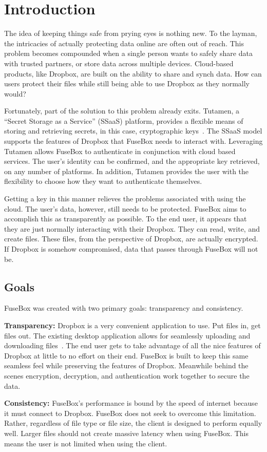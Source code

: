 \documentclass[11pt,twocolumn,letterpaper]{article}
\newcommand{\appname}{FuseBox }
\newcommand{\appnameWOspace}{FuseBox}
\newcommand{\custos}{Tutamen }
\newcommand{\custosWOspace}{Tutamen}
\begin{document}
\section{Introduction}
\label{sec:intro}
The idea of keeping things safe from prying eyes is nothing new.
To the layman, the intricacies of
actually protecting data online are often out of reach. This problem
becomes compounded when a single person wants to safely share data
with trusted partners, or store data across multiple devices.
Cloud-based products, like Dropbox, are built
on the ability to share and synch data. How can users protect their
files while still being able to use Dropbox as they normally would? 
\par Fortunately, part of the solution to this problem already exits.
\custosWOspace, a ``Secret Storage as a Service'' (SSaaS) platform, 
provides a flexible means of storing and
retrieving secrets, in this case, cryptographic
keys~\cite{custostrios}. 
The SSaaS model supports the features of
Dropbox that \appname needs to interact with. Leveraging \custos allows \appname to 
authenticate in conjunction with cloud based services. The user's
identity can be confirmed, and the appropriate key retrieved, on any number
of platforms. In addition, \custos provides the user with the 
flexibility to choose how they want to authenticate themselves. 
\par Getting a key in this manner relieves the problems associated
with using the cloud. The user's data, however, still needs to be
protected. \appname aims to accomplish this as transparently as
possible. To the end user, it appears that they are just normally
interacting with their Dropbox. They can read, write, and create
files. These files, from the perspective of Dropbox, are actually
encrypted. If Dropbox is somehow compromised, data that passes through \appname
will not be.    

\subsection{Goals}
\label{sec:goals}
\appname was created with two primary goals: transparency and consistency. 
\par {\bf Transparency:} Dropbox is a very convenient application to
use. Put files in, get files out. The existing desktop application
allows for seamlessly uploading and downloading files~\cite{dropboxclient}. The end user
gets to take advantage of all the nice features of Dropbox at little
to no effort on their end. \appname is built to keep this same 
seamless feel while preserving the features of Dropbox. Meanwhile behind the
scenes encryption, decryption, and authentication work together to
secure the data.     
\par {\bf Consistency:} \appnameWOspace's performance is bound by
the speed of internet because it must connect to Dropbox. 
\appname does not seek to overcome this
limitation. Rather, regardless of file type or file size, the client
is designed to perform equally well. Larger files should not create
massive latency when using \appnameWOspace. This means the user is not
limited when using the client.    
\end{document}
